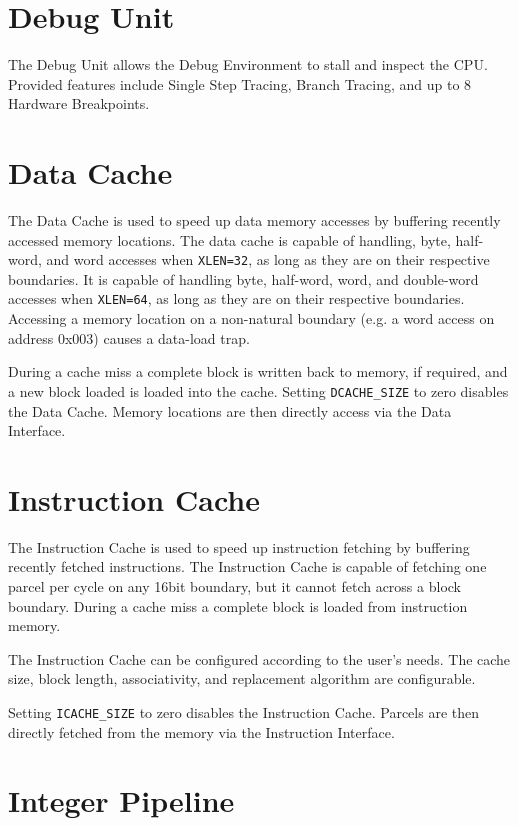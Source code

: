 \section{Debug Unit} \label{debug-unit-1}

The Debug Unit allows the Debug Environment to stall and inspect the
CPU. Provided features include Single Step Tracing, Branch Tracing, and
up to 8 Hardware Breakpoints.

\section{Data Cache} \label{data-cache}

The Data Cache is used to speed up data memory accesses by buffering
recently accessed memory locations. The data cache is capable of
handling, byte, half-word, and word accesses when \texttt{XLEN=32}, as long as
they are on their respective boundaries. It is capable of handling byte,
half-word, word, and double-word accesses when \texttt{XLEN=64}, as long as they
are on their respective boundaries. Accessing a memory location on a
non-natural boundary (e.g. a word access on address 0x003) causes a
data-load trap.

During a cache miss a complete block is written back to memory, if
required, and a new block loaded is loaded into the cache. Setting
\texttt{DCACHE\_SIZE} to zero disables the Data Cache. Memory locations
are then directly access via the Data Interface.

\section{Instruction Cache}\label{instruction-cache}

The Instruction Cache is used to speed up instruction fetching by
buffering recently fetched instructions. The Instruction Cache is
capable of fetching one parcel per cycle on any 16bit boundary, but it
cannot fetch across a block boundary. During a cache miss a complete
block is loaded from instruction memory.

The Instruction Cache can be configured according to the user's needs.
The cache size, block length, associativity, and replacement algorithm
are configurable.

Setting \texttt{ICACHE\_SIZE} to zero disables the Instruction Cache. Parcels
are then directly fetched from the memory via the Instruction Interface.

\section{Integer Pipeline}\label{integer-pipeline}


